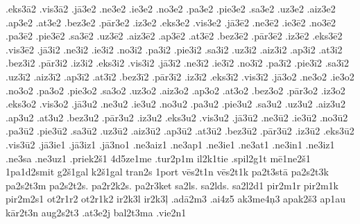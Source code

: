 {.eks3ā2
.vis3ā2
.jā3e2
.ne3e2
.ie3e2
.no3e2
.pa3e2
.pie3e2
.sa3e2
.uz3e2
.aiz3e2
.ap3e2
.at3e2
.bez3e2
.pār3e2
.iz3e2
.eks3e2
.vis3e2
.jā3ē2
.ne3ē2
.ie3ē2
.no3ē2
.pa3ē2
.pie3ē2
.sa3ē2
.uz3ē2
.aiz3ē2
.ap3ē2
.at3ē2
.bez3ē2
.pār3ē2
.iz3ē2
.eks3ē2
.vis3ē2
.jā3i2
.ne3i2
.ie3i2
.no3i2
.pa3i2
.pie3i2
.sa3i2
.uz3i2
.aiz3i2
.ap3i2
.at3i2
.bez3i2
.pār3i2
.iz3i2
.eks3i2
.vis3i2
.jā3ī2
.ne3ī2
.ie3ī2
.no3ī2
.pa3ī2
.pie3ī2
.sa3ī2
.uz3ī2
.aiz3ī2
.ap3ī2
.at3ī2
.bez3ī2
.pār3ī2
.iz3ī2
.eks3ī2
.vis3ī2
.jā3o2
.ne3o2
.ie3o2
.no3o2
.pa3o2
.pie3o2
.sa3o2
.uz3o2
.aiz3o2
.ap3o2
.at3o2
.bez3o2
.pār3o2
.iz3o2
.eks3o2
.vis3o2
.jā3u2
.ne3u2
.ie3u2
.no3u2
.pa3u2
.pie3u2
.sa3u2
.uz3u2
.aiz3u2
.ap3u2
.at3u2
.bez3u2
.pār3u2
.iz3u2
.eks3u2
.vis3u2
.jā3ū2
.ne3ū2
.ie3ū2
.no3ū2
.pa3ū2
.pie3ū2
.sa3ū2
.uz3ū2
.aiz3ū2
.ap3ū2
.at3ū2
.bez3ū2
.pār3ū2
.iz3ū2
.eks3ū2
.vis3ū2
.jā3ie1
.jā3iz1
.jā3no1
.ne3aiz1
.ne3ap1
.ne3ie1
.ne3at1
.ne3in1
.ne3iz1
.ne3sa
.ne3uz1
.priek2š1
4d5ze1me
.tur2p1m
il2k1tie
.spil2g1t
mē1ne2š1
1pa1d2smit
g2š1gal
k2š1gal
tran2s
1port
vēs2t1n
vēs2t1k
pa2t3stā
pa2s2t3k
pa2s2t3m
pa2s2t2s.
pa2r2k2s.
pa2r3ket
sa2ls.
sa2lds.
sa2l2d1
pir2m1r
pir2m1k
pir2m2s1
ot2r1r2
ot2r1k2
ir2k3l
ir2k3ļ
.adā2m3
.ai4z5
ak3me4ņ3
apak2š3
ap1au
kār2t3n
aug2s2t3
.at3e2j
bal2t3ma
.vie2n1
}
